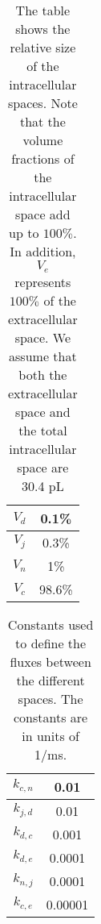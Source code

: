 \begin{table}
\begin{center}
\begin{tabular}{|c|c|} \hline
$V_d$ & 0.1\% \\ \hline
$V_j$ & 0.3\% \\ \hline
$V_n$ & 1\% \\ \hline
$V_c$ & 98.6\% \\ \hline
\end{tabular} 
\caption{The table shows the relative size of the intracellular spaces. Note that the volume fractions
of the intracellular space add up to $100\%$. In addition, $V_e$ represents $100\%$ of the extracellular space.
We assume that both the extracellular space and the total intracellular space are 30.4 pL
}
\end{center}
\end{table}

\begin{table}
\begin{center}
\begin{tabular}{|c|c|} \hline
$k_{c,n}$ & 0.01 \\ \hline
$k_{j,d}$ & 0.01 \\ \hline
$k_{d,c}$ & 0.001 \\ \hline
$k_{d,e}$ & 0.0001 \\ \hline
$k_{n,j}$ & 0.0001  \\ \hline
$k_{c,e}$ & 0.00001 \\ \hline
\end{tabular} 
\caption{\label{tab:k}Constants used to define the fluxes between the different spaces. The constants are in units of 1/ms.
}
\end{center}
\end{table}

